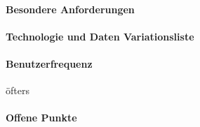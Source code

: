 \paragraph{Besondere Anforderungen}

\paragraph{Technologie und Daten Variationsliste}

\paragraph{Benutzerfrequenz}
öfters

\paragraph{Offene Punkte}

\newpage
